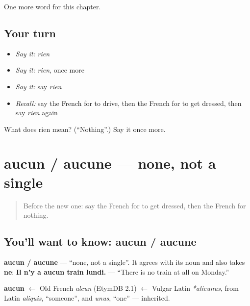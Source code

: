 \begin{grammarlens}[title={What you've built}]
One more word for this chapter.
\end{grammarlens}

\subsection*{Your turn}
\begin{itemize}
\raggedright
  \item \emph{Say it:} \emph{rien}
  \item \emph{Say it:} \emph{rien}, once more
  \item \emph{Say it:} say \emph{rien}
  \item \emph{Recall:} say the French for to drive, then the French for to get dressed, then say \emph{rien} again
\end{itemize}

\begin{tcolorbox}[breakable,colback=teal!4,colframe=teal!35!black,title={Before you move on}]
What does rien mean? (\textquotedblleft{}Nothing\textquotedblright{}.) Say it once more.
\end{tcolorbox}
\section[aucun / aucune]{aucun / aucune — none, not a single}

\label{lesson:FR-C139-aucun}



\begin{quote}
Before the new one: say the French for to get dressed, then the French for nothing.
\end{quote}

\subsection*{You'll want to know: aucun / aucune}
\textbf{aucun / aucune} — \textquotedblleft{}none, not a single\textquotedblright{}. It agrees with its noun and also takes \textbf{ne}: \textbf{Il n'y a aucun train lundi.} — \textquotedblleft{}There is no train at all on Monday.\textquotedblright{}

\begin{cousinweb}
\textbf{aucun} $\leftarrow$ Old French \emph{alcun} (EtymDB 2.1) $\leftarrow$ Vulgar Latin \emph{*alicunus}, from Latin \emph{aliquis}, \textquotedblleft{}someone\textquotedblright{}, and \emph{unus}, \textquotedblleft{}one\textquotedblright{} — inherited.
\end{cousinweb}

